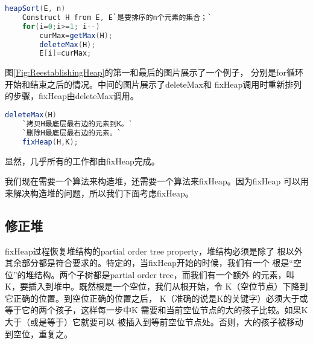 \begin{figure*}[!t]
{    }
    \hfil
    \caption{删除根的元素，并重建partial order tree属性}
    \label{Fig:ReestablishingHeap}
\end{figure*}

\begin{lstlisting}[language={Java}, keywordstyle=\color{blue!70}, commentstyle=\color{red!50!green!50!blue!50}]
heapSort(E, n)
    Construct H from E, E`是要排序的n个元素的集合；`
    for(i=0;i>=1; i--)
        curMax=getMax(H);
        deleteMax(H);
        E[i]=curMax;
\end{lstlisting}

图\ref{Fig:ReestablishingHeap}的第一和最后的图片展示了一个例子，
分别是for循环开始和结束之后的情况。中间的图片展示了deleteMax和
fixHeap调用时重新排列的步骤，fixHeap由deleteMax调用。
\begin{lstlisting}[language={Java}, keywordstyle=\color{blue!70}, commentstyle=\color{red!50!green!50!blue!50}]
deleteMax(H)
    `拷贝H最底层最右边的元素到K。`
    `删除H最底层最右边的元素。`
    fixHeap(H,K);
\end{lstlisting}
显然，几乎所有的工作都由fixHeap完成。

我们现在需要一个算法来构造堆，还需要一个算法来fixHeap。因为fixHeap
可以用来解决构造堆的问题，所以我们下面考虑fixHeap。

\subsection{修正堆}\label{Sec:FixHeap}
fixHeap过程恢复堆结构的partial order tree property，堆结构必须是除了
根以外其余部分都是符合要求的。特定的，当fixHeap开始的时候，我们有一个
根是“空位”的堆结构。两个子树都是partial order tree，而我们有一个额外
的元素，叫K，要插入到堆中。既然根是一个空位，我们从根开始，令
K（空位节点）下降到它正确的位置。到空位正确的位置之后，
K（准确的说是K的关键字）必须大于或等于它的两个孩子，这样每一步中K
需要和当前空位节点的大的孩子比较。如果K大于（或是等于）它就要可以
被插入到等前空位节点处。否则，大的孩子被移动到空位，重复之。

